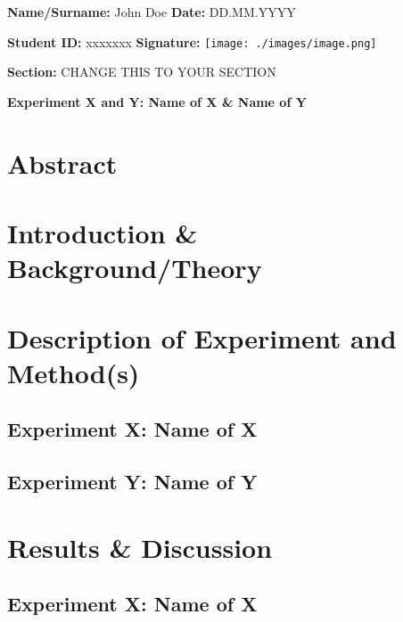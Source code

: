 \documentclass[11pt]{article}
\begin{document}
\textbf{Name/Surname:} John Doe \hfill \textbf{Date:} DD.MM.YYYY %

\textbf{Student ID:} xxxxxxx \hfill \textbf{Signature:}
    \texttt{[image: ./images/image.png]} %


\textbf{Section:} CHANGE THIS TO YOUR SECTION

\begin{center}
  \textbf{Experiment X and Y: Name of X \& Name of Y}
\end{center}

\section{Abstract}


\section{Introduction \& Background/Theory}



\section{Description of Experiment and Method(s)}
\subsection{Experiment X: Name of X}



\subsection{Experiment Y: Name of Y    }


\section{Results \& Discussion}
\subsection{Experiment X: Name of X}
\end{document}
